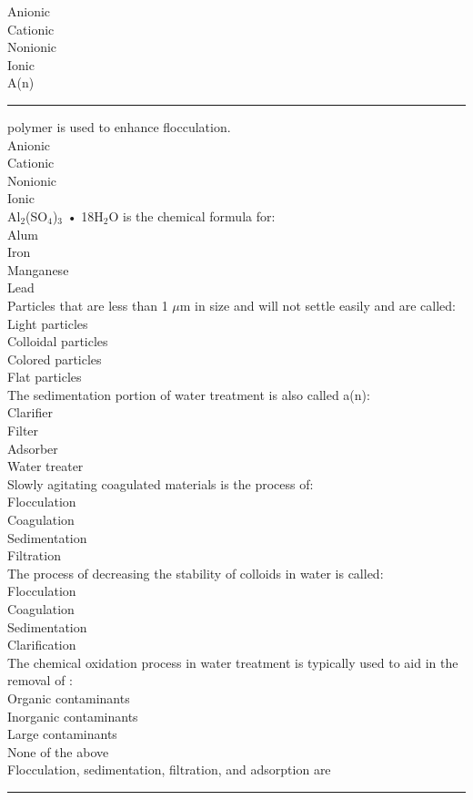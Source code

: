 Anionic\\
Cationic\\
Nonionic\\
Ionic\\
A(n) \rule{2cm}{0.3pt} polymer is used to enhance flocculation.\\
Anionic\\
Cationic\\
Nonionic\\
Ionic\\
Al$_2$(SO$_4$)$_3$ • 18H$_2$O is the chemical formula for:\\
Alum\\
Iron\\
Manganese\\
Lead\\
Particles that are less than 1 $\mu$m in size and will not settle easily and are called:\\
Light particles\\
Colloidal particles\\
Colored particles\\
Flat particles\\
The sedimentation portion of water treatment is also called a(n):\\
Clarifier\\
Filter\\
Adsorber\\
Water treater\\
Slowly agitating coagulated materials is the process of:\\
Flocculation\\
Coagulation\\
Sedimentation\\
Filtration\\
The process of decreasing the stability of colloids in water is called:\\
Flocculation\\
Coagulation\\
Sedimentation\\
Clarification\\
The chemical oxidation process in water treatment is typically used to aid in the\\
removal of :\\
Organic contaminants\\
Inorganic contaminants\\
Large contaminants\\
None of the above\\
Flocculation, sedimentation, filtration, and adsorption are \rule{2cm}{0.3pt}\\

